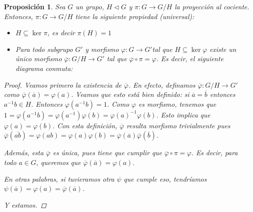 \documentclass[12pt]{book}
\newtheorem{prop}[teo]{Proposición}
\theoremstyle{definition}
\begin{document}
\begin{prop}Sea $G$ un grupo, $H\triangleleft G$ y $\pi:G\to G/H$ la proyección al cociente. Entonces, $\pi:G\to G/H$ tiene la siguiente propiedad (universal): \begin{itemize}\item $H\subseteq \ker \pi$, es decir $\pi(H)=1$ \item Para todo subgrupo $G'$ y morfismo $\varphi:G\to G'$tal que $H\subseteq \ker \varphi$ existe un único morfismo $\overline{\varphi}:G/H\to G'$ tal que $\overline{\varphi}\circ \pi = \varphi$. Es decir, el siguiente diagrama conmuta:\end{itemize}

\begin{center}
\end{center}

\begin{proof}
Veamos primero la existencia de $\overline{\varphi}$. En efecto, definamos $\overline{\varphi}:G/H\to G'$ como $\overline{\varphi}(\overline{a}) = \varphi(a)$. Veamos que esto está bien definido: si $\overline{a}=\overline{b}$ entonces $a^{-1}b\in H$. Entonces $\varphi(a^{-1}b) = 1$. Como $\varphi$ es morfismo, tenemos que $1=\varphi(a^{-1}b) = \varphi(a^{-1})\varphi(b) = \varphi(a)^{-1}\varphi(b)$. Esto implica que $\varphi(a)=\varphi(b)$. Con esta definición, $\overline{\varphi}$ resulta morfismo trivialmente pues $\overline{\varphi}(\overline{ab})=\varphi(ab)=\varphi(a)\varphi(b) = \overline{\varphi}(\overline{a})\overline{\varphi}(\overline{b})$.

Además, esta $\overline{\varphi}$ es única, pues tiene que cumplir que $\overline{\varphi}\circ \pi = \varphi$. Es decir, para todo $a\in G$, queremos que $\overline{\varphi}(\overline{a})=\varphi(a)$. 

En otras palabras, si tuvieramos otra $\psi$ que cumple eso, tendríamos $\psi(\overline{a})=\varphi(a) = \overline{\varphi}(\overline{a})$. 

Y estamos.
\end{proof}
\end{prop}
\end{document}
